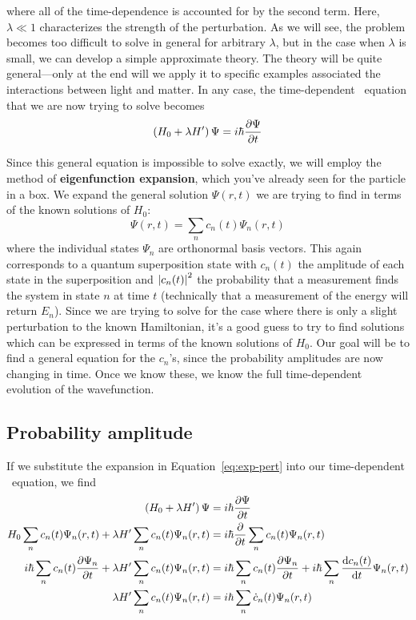 where all of the time-dependence is accounted for by the second term. Here, $\lambda \ll 1$ characterizes the strength of the perturbation. As we will see, the problem becomes too difficult to solve in general for arbitrary $\lambda$, but in the case when $\lambda$ is small, we can develop a simple approximate theory. The theory will be quite general---only at the end will we apply it to specific examples associated the interactions between light and matter. In any case, the time-dependent \Sch\ equation that we are now trying to solve becomes
\begin{equation}
	\left(H_0 + \lambda H'\right)\Psi = i\hbar \pdv{\Psi}{t} \label{eq:sch-pert}
\end{equation}

Since this general equation is impossible to solve exactly, we will employ the method of \textbf{eigenfunction expansion}, which you've already seen for the particle in a box. We expand the general solution $\Psi(r,t)$ we are trying to find in terms of the known solutions of $H_0$:
\begin{equation}
	\Psi(r,t) = \sum_n c_n(t) \Psi_n(r,t) \label{eq:exp-pert}
\end{equation}
where the individual states $\Psi_n$ are orthonormal basis vectors. This again corresponds to a quantum superposition state with $c_n(t)$ the amplitude of each state in the superposition and $\abs{c_n(t)}^2$ the probability that a measurement finds the system in state $n$ at time $t$ (technically that a measurement of the energy will return $E_n$). Since we are trying to solve for the case where there is only a slight perturbation to the known Hamiltonian, it's a good guess to try to find solutions which can be expressed in terms of the known solutions of $H_0$. Our goal will be to find a general equation for the $c_n$'s, since the probability amplitudes are now changing in time. Once we know these, we know the full time-dependent evolution of the wavefunction. \par 


\subsection{Probability amplitude}
If we substitute the expansion in Equation~\ref{eq:exp-pert} into our time-dependent \Sch\ equation, we find
\begin{align*}
	\left(H_0 + \lambda H'\right)\Psi &= i\hbar \pdv{\Psi}{t} \\
	H_0 \sum_n c_n(t) \Psi_n(r,t) + \lambda H'\sum_n c_n(t) \Psi_n(r,t) &= i\hbar \pdv{t}\sum_n c_n(t) \Psi_n(r,t) \\
	i\hbar\sum_n c_n(t) \pdv{\Psi_n}{t} + \lambda H'\sum_n c_n(t) \Psi_n(r,t) &= i\hbar \sum_n c_n(t) \pdv{\Psi_n}{t} + i\hbar \sum_n \dv{c_n(t)}{t} \Psi_n(r,t) \\
	\lambda H'\sum_n c_n(t) \Psi_n(r,t) &= i\hbar \sum_n \dot{c}_n(t) \Psi_n(r,t)
\end{align*}

